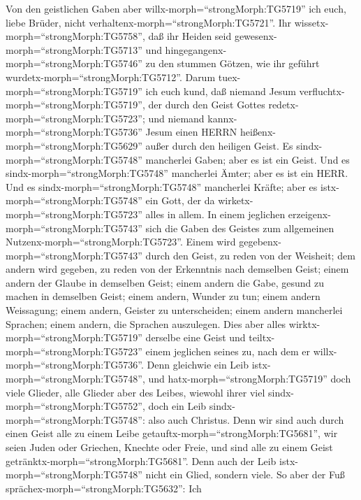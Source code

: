  Von den geistlichen Gaben aber
willx-morph=``strongMorph:TG5719'' ich euch, liebe Brüder, nicht
verhaltenx-morph=``strongMorph:TG5721''.  Ihr
wissetx-morph=``strongMorph:TG5758'', daß ihr Heiden seid
gewesenx-morph=``strongMorph:TG5713'' und
hingegangenx-morph=``strongMorph:TG5746'' zu den stummen Götzen, wie ihr
geführt wurdetx-morph=``strongMorph:TG5712''.  Darum
tuex-morph=``strongMorph:TG5719'' ich euch kund, daß niemand Jesum
verfluchtx-morph=``strongMorph:TG5719'', der durch den Geist Gottes
redetx-morph=``strongMorph:TG5723''; und niemand
kannx-morph=``strongMorph:TG5736'' Jesum einen HERRN
heißenx-morph=``strongMorph:TG5629'' außer durch den heiligen Geist.
 Es sindx-morph=``strongMorph:TG5748'' mancherlei Gaben;
aber es ist ein Geist.  Und es
sindx-morph=``strongMorph:TG5748'' mancherlei Ämter; aber es ist ein
HERR.  Und es sindx-morph=``strongMorph:TG5748'' mancherlei
Kräfte; aber es istx-morph=``strongMorph:TG5748'' ein Gott, der da
wirketx-morph=``strongMorph:TG5723'' alles in allem.  In
einem jeglichen erzeigenx-morph=``strongMorph:TG5743'' sich die Gaben
des Geistes zum allgemeinen Nutzenx-morph=``strongMorph:TG5723''.
 Einem wird gegebenx-morph=``strongMorph:TG5743'' durch den
Geist, zu reden von der Weisheit; dem andern wird gegeben, zu reden von
der Erkenntnis nach demselben Geist;  einem andern der
Glaube in demselben Geist; einem andern die Gabe, gesund zu machen in
demselben Geist;  einem andern, Wunder zu tun; einem andern
Weissagung; einem andern, Geister zu unterscheiden; einem andern
mancherlei Sprachen; einem andern, die Sprachen auszulegen.
 Dies aber alles wirktx-morph=``strongMorph:TG5719''
derselbe eine Geist und teiltx-morph=``strongMorph:TG5723'' einem
jeglichen seines zu, nach dem er willx-morph=``strongMorph:TG5736''.
 Denn gleichwie ein Leib istx-morph=``strongMorph:TG5748'',
und hatx-morph=``strongMorph:TG5719'' doch viele Glieder, alle Glieder
aber des Leibes, wiewohl ihrer viel sindx-morph=``strongMorph:TG5752'',
doch ein Leib sindx-morph=``strongMorph:TG5748'': also auch Christus.
 Denn wir sind auch durch einen Geist alle zu einem Leibe
getauftx-morph=``strongMorph:TG5681'', wir seien Juden oder Griechen,
Knechte oder Freie, und sind alle zu einem Geist
getränktx-morph=``strongMorph:TG5681''.  Denn auch der Leib
istx-morph=``strongMorph:TG5748'' nicht ein Glied, sondern viele.
 So aber der Fuß sprächex-morph=``strongMorph:TG5632'': Ich
